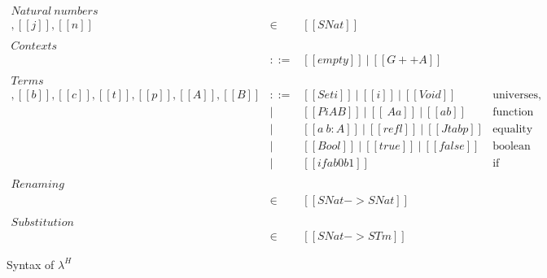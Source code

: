 \documentclass[acmsmall]{acmart}
\newcommand{\lang}{$\lambda^H$\xspace}
\begin{document}
\begin{figure}[h]
\[
\begin{array}{lcll}
\mathit{Natural\ numbers}\\
[[i]],[[j]],[[n]] & \in &  [[SNat]] &  \\ \\

\mathit{Contexts}\\
[[G]]       & ::= & [[empty]]\ |\ [[G ++ A]] &  \\ \\
\mathit{Terms}\\
[[a]],[[b]],[[c]],[[t]],[[p]],[[A]],[[B]] & ::= & [[Set i]]\ |\ [[i]]\  |\ [[Void]]
                  & \mbox{universes, variables, empty type} \\
            & |   & [[Pi A B]]\ |\ [[\ A a]]\ |\ [[a b]]
                  & \mbox{function types, abstractions, applications} \\
            & |   & [[a ~ b : A ]]\ |\  [[refl]]\ |\ [[J t a b p]]
                  & \mbox{equality types, reflexivity proof, J eliminator} \\
            & |   & [[Bool]]\ |\  [[true]]\ |\  [[false]]\ %
                  & \mbox{boolean type, true, false} \\
            & |   & [[if a b0 b1]]
                  & \mbox{if} \\ \\
\mathit{Renaming}\\
[[xi]] & \in & [[SNat -> SNat]] & \\ \\
\mathit{Substitution}\\
[[rho]] & \in & [[SNat -> STm]] &
\end{array}
\]
  \caption{Syntax of \lang}
  \label{fig:syntax}
\end{figure}

\end{document}
